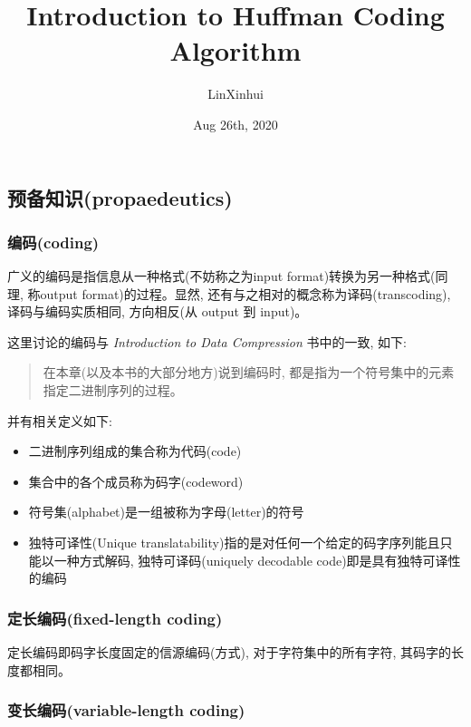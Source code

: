 \documentclass{article}
\title{Introduction to Huffman Coding Algorithm}
\author{LinXinhui}
\date{Aug 26th, 2020}
\begin{document}
\begin{CJK}{UTF8}{gbsn}

\maketitle %
\newpage
\tableofcontents %
\newpage

\section{预备知识(propaedeutics)}\label{header-n397}

\subsubsection{编码(coding)}\label{header-n398}

广义的编码是指信息从一种格式(不妨称之为input format)转换为另一种格式(同理, 称output format)的过程。显然, 还有与之相对的概念称为译码(transcoding), 译码与编码实质相同, 方向相反(从 output 到 input)。

这里讨论的编码与 \emph{Introduction to Data Compression} 书中的一致, 如下:

\begin{quote}
在本章(以及本书的大部分地方)说到编码时, 都是指为一个符号集中的元素指定二进制序列的过程。
\end{quote}

并有相关定义如下:

\begin{itemize}
\item
二进制序列组成的集合称为代码(code)
\item
集合中的各个成员称为码字(codeword)
\item
符号集(alphabet)是一组被称为字母(letter)的符号
\item
独特可译性(Unique translatability)指的是对任何一个给定的码字序列能且只能以一种方式解码,
独特可译码(uniquely decodable code)即是具有独特可译性的编码
\end{itemize}

\subsubsection{定长编码(fixed-length coding)}\label{header-n413}

定长编码即码字长度固定的信源编码(方式), 对于字符集中的所有字符, 其码字的长度都相同。

\subsubsection{变长编码(variable-length coding)}\label{header-n415}


\end{CJK}
\end{document}
